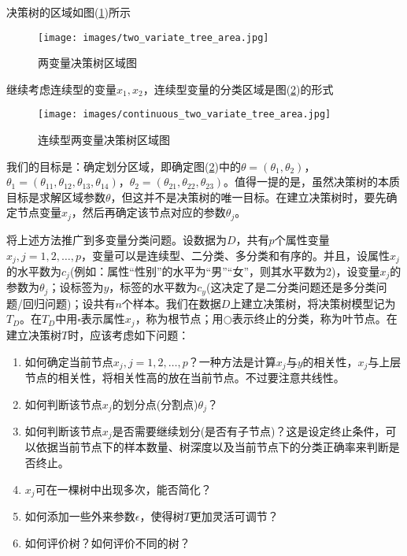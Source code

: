         决策树的区域如图(\ref{fig:两变量决策树区域图})所示
                \begin{figure}[H]
                \centering
                \texttt{[image: images/two\_variate\_tree\_area.jpg]}
                \caption{两变量决策树区域图}
                \label{fig:两变量决策树区域图}
                \end{figure}
        继续考虑连续型的变量$x_1,x_2$，连续型变量的分类区域是图(\ref{fig:连续型两变量决策树区域图})的形式
                \begin{figure}[H]
                \centering
                \texttt{[image: images/continuous\_two\_variate\_tree\_area.jpg]}
                \caption{连续型两变量决策树区域图}
                \label{fig:连续型两变量决策树区域图}
                \end{figure}
        \par
        我们的目标是：确定划分区域，即确定图(\ref{fig:连续型两变量决策树区域图})中的$\theta = (\theta_1,\theta_2)$，$\theta_1 = (\theta_{11},\theta_{12},\theta_{13},\theta_{14})$，$\theta_2 = (\theta_{21},\theta_{22},\theta_{23})$。值得一提的是，虽然决策树的本质目标是求解区域参数$\theta$，但这并不是决策树的唯一目标。在建立决策树时，要先确定节点变量$x_j$，然后再确定该节点对应的参数$\theta_j$。
        \par
        将上述方法推广到多变量分类问题。设数据为$D$，共有$p$个属性变量$x_j,j=1,2,\dots,p$，变量可以是连续型、二分类、多分类和有序的。并且，设属性$x_j$的水平数为$c_j$(例如：属性“性别”的水平为“男”“女”，则其水平数为2)，设变量$x_j$的参数为$\theta_j$；设标签为$y$，标签的水平数为$c_y$(这决定了是二分类问题还是多分类问题/回归问题)；设共有$n$个样本。我们在数据$D$上建立决策树，将决策树模型记为$T_D$。在$T_D$中用$\square$表示属性$x_j$，称为根节点；用$\bigcirc$表示终止的分类，称为叶节点。在建立决策树$T$时，应该考虑如下问题：
        \begin{enumerate}
        \item 如何确定当前节点$x_j,j=1,2,\dots,p$？一种方法是计算$x_j$与$y$的相关性，$x_j$与上层节点的相关性，将相关性高的放在当前节点。不过要注意共线性。
        \item 如何判断该节点$x_j$的划分点(分割点)$\theta_j$？
        \item 如何判断该节点$x_j$是否需要继续划分(是否有子节点)？这是设定终止条件，可以依据当前节点下的样本数量、树深度以及当前节点下的分类正确率来判断是否终止。
        \item $x_j$可在一棵树中出现多次，能否简化？
        \item 如何添加一些外来参数$\epsilon$，使得树$T$更加灵活可调节？
        \item 如何评价树？如何评价不同的树？
        \end{enumerate}

